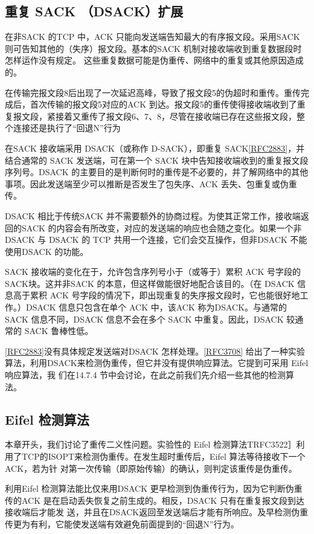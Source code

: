 \subsection{重复 SACK （DSACK）扩展}
在非SACK 的TCP 中，ACK 只能向发送端告知最大的有序报文段。采用SACK 则可告知其他的（失序）报文段。基本的SACK 机制对接收端收到重复数据段时怎样运作没有规定。
这些重复数据可能是伪重传、网络中的重复或其他原因造成的。

在传输完报文段8后出现了一次延迟高峰，导致了报文段5的伪超时和重传。重传完成后，首次传输的报文段5对应的ACK 到达。报文段5的重传使得接收端收到了重复报文段，紧接着又重传了报文段6、7、8，尽管在接收端已存在这些报文段，整个连接还是执行了“回退N”行为

在SACK 接收端采用 DSACK（或称作 D-SACK），即重复 SACK\href{https://www.rfc-editor.org/rfc/rfc2883}{[RFC2883]}，并结合通常的 SACK 发送端，可在第一个 SACK 块中告知接收端收到的重复报文段序列号。DSACK
的主要目的是判断何时的重传是不必要的，并了解网络中的其他事项。因此发送端至少可以推断是否发生了包失序、ACK 丢失、包重复或伪重传。

DSACK 相比于传统SACK 并不需要额外的协商过程。为使其正常工作，接收端返回的SACK 的内容会有所改变，对应的发送端的响应也会随之变化。如果一个非 DSACK 与
DSACK 的 TCP 共用一个连接，它们会交互操作，但非DSACK 不能使用DSACK 的功能。

SACK 接收端的变化在于，允许包含序列号小于（或等于）累积 ACK 号字段的SACK块。这并非SACK 的本意，但这样做能很好地配合该目的。（在 DSACK 信息高于累积 ACK
号字段的情况下，即出现重复的失序报文段时，它也能很好地工作。）DSACK 信息只包含在单个 ACK 中，该ACK 称为DSACK。与通常的SACK 信息不同，DSACK 信息不会在多个
SACK 中重复。因此，DSACK 较通常的 SACK 鲁棒性低。

\href{https://www.rfc-editor.org/rfc/rfc2883}{[RFC2883]}没有具体规定发送端对DSACK 怎样处理。\href{https://www.rfc-editor.org/rfc/rfc3708}{[RFC3708]} 给出了一种实验算法，利用DSACK来检测伪重传，但它并没有提供响应算法。它提到可采用 Eifel 响应算法，我
们在14.7.4 节中会讨论，在此之前我们先介绍一些其他的检测算法。

\subsection{Eifel 检测算法}
本章开头，我们讨论了重传二义性问题。实验性的 Eifel 检测算法TRFC3522］利用了TCP的ISOPT来检测伪重传。在发生超时重传后，Eifel 算法等待接收下一个ACK，若为针
对第一次传输（即原始传输）的确认，则判定该重传是伪重传。

利用Eifel 检测算法能比仅来用DSACK 更早检测到伪重传行为，因为它判断伪重传的ACK 是在启动丢失恢复之前生成的。相反，DSACK 只有在重复报文段到达接收端后才能发
送，并且在DSACK返回至发送端后才能有所响应。及早检测伪重传更为有利，它能使发送端有效避免前面提到的“回退N”行为。

